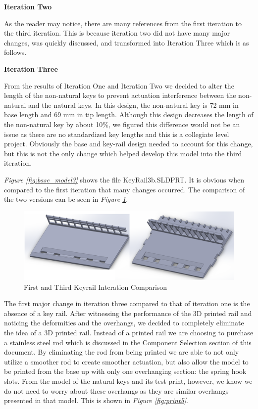 \textbf{Iteration Two}

As the reader may notice, there are many references from the first iteration to the third iteration. This is because iteration two did not have many major changes, was quickly discussed, and transformed into Iteration Three which is as follows.

\textbf{Iteration Three}

From the results of Iteration One and Iteration Two we decided to alter the length of the non-natural keys to prevent actuation interference between the non-natural and the natural keys. In this design, the non-natural key is 72 mm in base length and 69 mm in tip length. Although this design decreases the length of the non-natural key by about 10\%, we figured this difference would not be an issue as there are no standardized key lengths and this is a collegiate level project. Obviously the base and key-rail design needed to account for this change, but this is not the only change which helped develop this model into the third iteration.

\textit{Figure \ref{fig:base_model3}} shows the file KeyRail3b.SLDPRT. It is obvious when compared to the first iteration that many changes occurred. The comparison of the two versions can be seen in \textit{Figure \ref{fig:base_model2}}.

\begin{figure}[h!]
  \centering
  \includegraphics[width=0.8\linewidth]{image/BaseModel2.png}
  \caption{First and Third Keyrail Interation Comparison}
  \label{fig:base_model2}
\end{figure}

The first major change in iteration three compared to that of iteration one is the absence of a key rail. After witnessing the performance of the 3D printed rail and noticing the deformities and the overhangs, we decided to completely eliminate the idea of a 3D printed rail. Instead of a printed rail we are choosing to purchase a stainless steel rod which is discussed in the Component Selection section of this document. By eliminating the rod from being printed we are able to not only utilize a smoother rod to create smoother actuation, but also allow the model to be printed from the base up with only one overhanging section: the spring hook slots. From the model of the natural keys and its test print, however, we know we do not need to worry about these overhangs as they are similar overhangs presented in that model. This is shown in \textit{Figure \ref{fig:print5}}.

